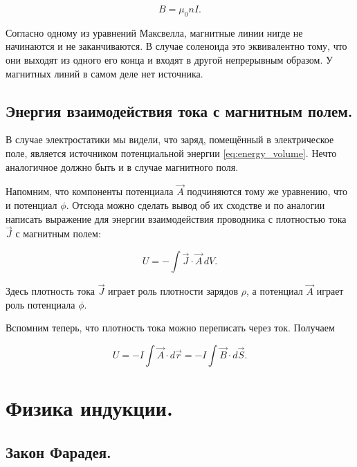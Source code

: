 \documentclass[12pt,a4paper]{article}
\numberwithin{equation}{section}
\numberwithin{equation}{section}
\begin{document}
\begin{equation}
  \label{eq:mfield_solenoid}
  B = \mu_0 n I.
\end{equation}

Согласно одному из уравнений Максвелла, магнитные линии нигде не
начинаются и не заканчиваются. В случае соленоида это эквивалентно
тому, что они выходят из одного его конца и входят в другой
непрерывным образом. У магнитных линий в самом деле нет источника. 

\subsection{Энергия взаимодействия тока с магнитным полем. }
\label{sec:magnet_energy}

В случае электростатики мы видели, что заряд, помещённый в
электрическое поле, является источником потенциальной энергии
\eqref{eq:energy_volume}. Нечто аналогичное должно быть и в случае
магнитного поля. 

Напомним, что компоненты потенциала $\vec{A}$ подчиняются тому же
уравнению, что и потенциал $\phi$. Отсюда можно сделать вывод об их
сходстве и по аналогии написать выражение для энергии взаимодействия
проводника с плотностью тока $\vec{J}$ с магнитным полем: 

\begin{equation}
  \label{eq:magnet_energy_1}
  U = - \int \vec{J} \cdot \vec{A} \, dV.
\end{equation}

Здесь плотность тока $\vec{J}$ играет роль плотности зарядов $\rho$, а
потенциал $\vec{A}$ играет роль потенциала $\phi$. 

Вспомним теперь, что плотность тока можно переписать через
ток. Получаем

\begin{equation}
  \label{eq:magnet_energy_2}
  U = - I \int \vec{A} \cdot d \vec{r} = - I \int \vec{B} \cdot d \vec{S}.
\end{equation}

\section{Физика индукции.}
\label{sec:induction}

\subsection{Закон Фарадея.}
\label{sec:faradays_law}
\end{document}
